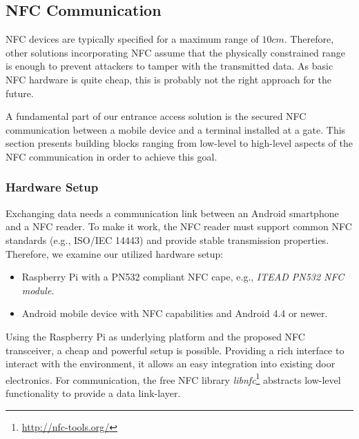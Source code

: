
\subsection{NFC Communication}\label{sec:comm}
NFC devices are typically specified for a maximum range of $10cm$. Therefore, other solutions incorporating NFC assume that the physically constrained range is enough to prevent attackers to tamper with the transmitted data.
As basic NFC hardware is quite cheap, this is probably not the right approach for the future.

A fundamental part of our \app entrance access solution is the secured NFC communication between a mobile device and a terminal installed at a gate.
This section presents building blocks ranging from low-level to high-level aspects of the NFC communication in order to achieve this goal.


\subsubsection{Hardware Setup}
Exchanging data needs a communication link between an Android smartphone and a NFC reader.
To make it work, the NFC reader must support common NFC standards (e.g., ISO/IEC 14443) and provide stable transmission properties.
Therefore, we examine our utilized hardware setup:
%
\begin{itemize}
	\item Raspberry Pi with a PN532 compliant NFC cape, e.g., \textit{ITEAD PN532 NFC module}.
	\item Android mobile device with NFC capabilities and Android 4.4 or newer.
\end{itemize}
%
Using the Raspberry Pi as underlying platform and the proposed NFC transceiver, a cheap and powerful setup is possible.
Providing a rich interface to interact with the environment, it allows an easy integration into existing door electronics.
For communication, the free NFC library \textit{libnfc}\footnote{\url{http://nfc-tools.org/}} abstracts low-level functionality to provide a data link-layer. 

